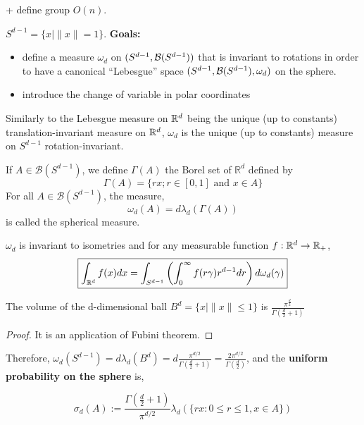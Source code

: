 \documentclass{article}
\begin{document}
+ define group $O(n)$.

$S^{d-1} = \{x \mid \|x\|=1\}$. \textbf{Goals:}
\begin{itemize}
\item define a measure $\omega_d$ on
  $(S^{d-1},\mathcal{B}(S^{d-1}))$ that is invariant to rotations in order to have a
  canonical ``Lebesgue'' space $(S^{d-1},\mathcal{B}(S^{d-1}), \omega_d)$ on the sphere.
\item introduce the change of variable in polar coordinates
\end{itemize}

Similarly to the Lebesgue measure on $\mathbb{R}^{d}$ being the unique (up to constants)
translation-invariant measure on $\mathbb{R}^{d}$, $\omega_d$ is the unique (up to
constants) measure on $S^{d-1}$ rotation-invariant.

\begin{definition}
  If $A \in \mathcal{B}\left(S^{d-1}\right)$, we define $\Gamma(A)$ the Borel set
  of $\mathbb{R}^{d}$ defined by
  $$
  \Gamma(A)=\{r x ; r \in[0,1] \text { and } x \in A\}
  $$
  For all $A \in \mathcal{B}\left(S^{d-1}\right)$, the measure,
  $$
  \omega_{d}(A)=d \lambda_{d}(\Gamma(A))
  $$
  is called the spherical measure. 
\end{definition}

\begin{theorem}
  $\omega_d$ is invariant to isometries and for any measurable function $f: \mathbb{R}^{d} \to \mathbb{R}_+$, $$\boxed{\int_{\mathbb{R}^{d}} f(x) d x=\int_{S^{d-1}}\left(\int_{0}^{\infty} f(r \gamma) r^{d-1} d r\right) d \omega_d(\gamma)}$$
\end{theorem}

\begin{prop}
  The volume of the d-dimensional ball $B^d = \{x \mid \|x\| \leq 1\} $ is $\frac{\pi^{\frac{d}{2}}}{\Gamma\left(\frac{d}{2}+1\right)}$
\end{prop}

\begin{proof}
  It is an application of Fubini theorem.
\end{proof}
Therefore, $\omega_d(S^{d-1}) = d\lambda_d(B^d) = d\frac{\pi^{d /
    2}}{\Gamma\left(\frac{d}{2}+1\right)} = \frac{2 \pi^{d /
    2}}{\Gamma\left(\frac{d}{2}\right)} $, and the \textbf{uniform probability
  on the sphere} is,

\begin{equation}
  \sigma_{d}(A):=\frac{\Gamma\left(\frac{d}{2}+1\right)}{\pi^{d / 2}} \lambda_{d}(\{r x: 0 \leq r \leq 1, x \in A\})
\end{equation}
\end{document}
